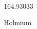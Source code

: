 \documentclass[12pt]{article}
\begin{document}
\hfill{}
\vfill
\begin{center}
  {\fontsize{50}{60}
  }

  \vspace{1em}

  164.93033

Holmium
\end{center}
\vfill
\end{document}
